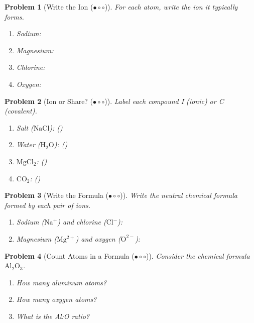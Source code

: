 \documentclass[a4paper,11pt]{article}
\newcommand{\easy}{(\ensuremath{\bullet \circ \circ})}
\theoremstyle{listprobstyle}
\newtheorem{problem}{Problem}
\begin{document}
\begin{problem}[Write the Ion \easy]
For each atom, write the ion it typically forms.
\vspace{-0.6\baselineskip}
\begin{enumerate}[label=\alph*),itemsep=0pt,parsep=0pt,topsep=0pt]
\item Sodium: \underline{\phantom{XXXXXX}}
\item Magnesium: \underline{\phantom{XXXXXX}}
\item Chlorine: \underline{\phantom{XXXXXX}}
\item Oxygen: \underline{\phantom{XXXXXX}}
\end{enumerate}
\end{problem}

\begin{problem}[Ion or Share? \easy]
Label each compound I (ionic) or C (covalent).
\vspace{-0.6\baselineskip}
\begin{enumerate}[label=\alph*),itemsep=0pt,parsep=0pt,topsep=0pt]
\item Salt ($\mathrm{NaCl}$): (\phantom{X})
\item Water ($\mathrm{H_2O}$): (\phantom{X})
\item $\mathrm{MgCl_2}$: (\phantom{X})
\item $\mathrm{CO_2}$: (\phantom{X})
\end{enumerate}
\end{problem}

\newpage
\begin{problem}[Write the Formula \easy]
Write the neutral chemical formula formed by each pair of ions.
\vspace{-0.6\baselineskip}
\begin{enumerate}[label=\alph*),itemsep=0pt,parsep=0pt,topsep=0pt]
\item Sodium ($\mathrm{Na^+}$) and chlorine ($\mathrm{Cl^-}$):
    \underline{\phantom{XXXXXX}}
\item Magnesium ($\mathrm{Mg^{2+}}$) and oxygen ($\mathrm{O^{2-}}$):
    \underline{\phantom{XXXXXX}}
\end{enumerate}
\end{problem}

\begin{problem}[Count Atoms in a Formula \easy]
Consider the chemical formula $\mathrm{Al_2O_3}$.
\vspace{-0.6\baselineskip}
\begin{enumerate}[label=\alph*),itemsep=0pt,parsep=0pt,topsep=0pt]
\item How many aluminum atoms? \underline{\phantom{XXX}}
\item How many oxygen atoms? \underline{\phantom{XXX}}
\item What is the Al:O ratio? \underline{\phantom{XXXX}}
\end{enumerate}
\end{problem}
\end{document}
